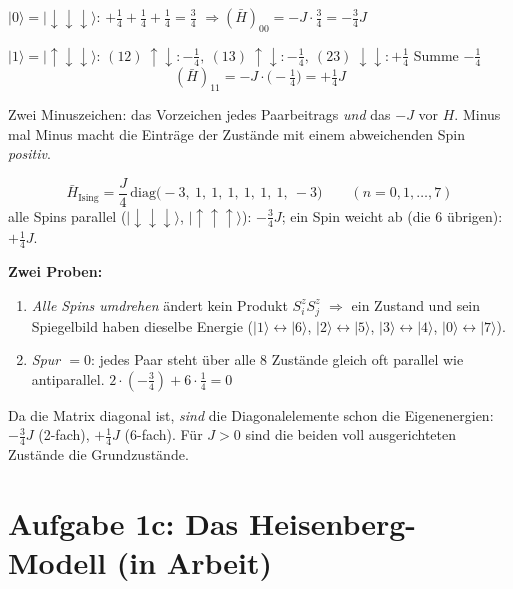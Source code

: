 \documentclass[11pt,a4paper]{article}
\newcommand{\ket}[1]{\lvert #1\rangle}
\newcommand{\up}{{\uparrow}}
\newcommand{\dn}{{\downarrow}}
\newcommand{\Hbar}{\bar H}
\begin{document}
\begin{rechnung}
$\ket 0 = \ket{\dn\dn\dn}$: \quad $+\tfrac14+\tfrac14+\tfrac14 = \tfrac34$ \quad$\Rightarrow$\quad $(\Hbar)_{00} = -J\cdot\tfrac34 = -\tfrac34J$

$\ket 1 = \ket{\up\dn\dn}$: \quad $(12)\ \up\dn: -\tfrac14,\ (13)\ \up\dn: -\tfrac14,\ (23)\ \dn\dn: +\tfrac14$ \quad Summe $-\tfrac14$
\[
(\Hbar)_{11} = -J\cdot\big(-\tfrac14\big) = +\tfrac14 J
\]
\end{rechnung}

\begin{falle}
Zwei Minuszeichen: das Vorzeichen jedes Paarbeitrags \emph{und} das $-J$ vor $H$. Minus mal Minus macht die Einträge der Zustände mit einem abweichenden Spin \emph{positiv}.
\end{falle}

\begin{tcolorbox}[colback=yellow!6,colframe=orange!70!black,fonttitle=\bfseries,title=Ergebnis 1b: Ising-Matrix]
\[
\Hbar_\text{Ising} = \frac J4\,\mathrm{diag}\big(-3,\ 1,\ 1,\ 1,\ 1,\ 1,\ 1,\ -3\big)
\qquad (n = 0,1,\dots,7)
\]
alle Spins parallel ($\ket{\dn\dn\dn}$, $\ket{\up\up\up}$): $-\tfrac34J$; \quad ein Spin weicht ab (die 6 übrigen): $+\tfrac14J$.
\end{tcolorbox}

\textbf{Zwei Proben:}
\begin{enumerate}[itemsep=2pt]
\item \emph{Alle Spins umdrehen} ändert kein Produkt $S^z_iS^z_j$ $\Rightarrow$ ein Zustand und sein Spiegelbild haben dieselbe Energie ($\ket1\leftrightarrow\ket6$, $\ket2\leftrightarrow\ket5$, $\ket3\leftrightarrow\ket4$, $\ket0\leftrightarrow\ket7$).
\item \emph{Spur $=0$}: jedes Paar steht über alle 8 Zustände gleich oft parallel wie antiparallel. $2\cdot(-\tfrac34) + 6\cdot\tfrac14 = 0$ \checkmark
\end{enumerate}

Da die Matrix diagonal ist, \emph{sind} die Diagonalelemente schon die Eigenenergien: $-\tfrac34J$ (2-fach), $+\tfrac14J$ (6-fach). Für $J>0$ sind die beiden voll ausgerichteten Zustände die Grundzustände.

\section{Aufgabe 1c: Das Heisenberg-Modell (in Arbeit)}
\end{document}
